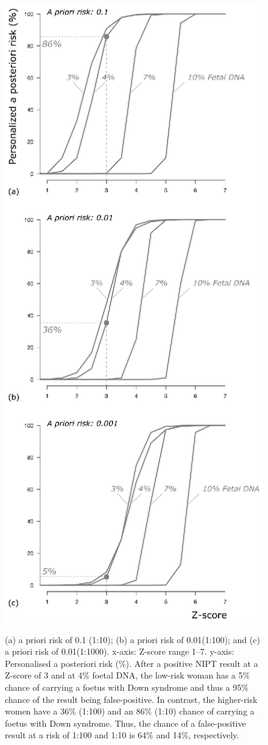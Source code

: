 \begin{figure}
	\includegraphics[width=0.6\linewidth]{img/NIPTRIC_Fig2}
	\label{fig:NIPTRIC_Fig2}
\end{figure}
\begin{figure}
	\caption[PPR at different risks]{(a) a priori risk of 0.1 (1:10); (b) a priori risk of 0.01(1:100); and (c) a priori risk of 0.01(1:1000). x-axis: Z-score range 1–7. y-axis: Personalised a posteriori risk (\%). After a positive NIPT result at a Z-score of 3 and at 4\% foetal DNA, the low-risk woman has a 5\% chance of carrying a foetus with Down syndrome and thus a 95\% chance of the result being false-positive. In contrast, the higher-risk women have a 36\% (1:100) and an 86\% (1:10) chance of carrying a foetus with Down syndrome. Thus, the chance of a false-positive result at a risk of 1:100 and 1:10 is 64\% and 14\%, respectively.}
	
\end{figure}

